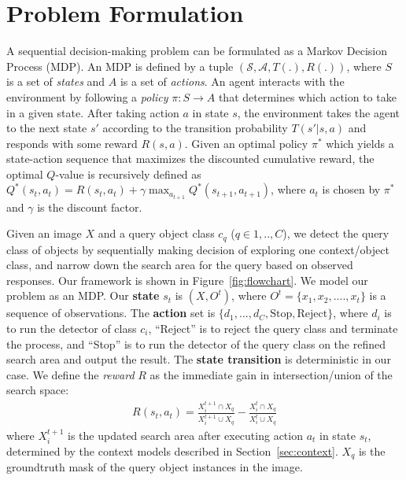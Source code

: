 \section{Problem Formulation}
A sequential decision-making problem can be formulated as a Markov Decision
Process (MDP).
An MDP is defined by a tuple $(\mathcal{S}, \mathcal{A}, T(.), R(.))$,
where $S$ is a set of \textit{states} and $A$ is a set of
\textit{actions}. An agent interacts with the
environment by following a
\textit{policy} $\pi: S \rightarrow A$ that determines which action to take in a
given state. After taking action $a$ in
state $s$, the environment takes the
agent to the next state $s'$ according to the transition probability $T(s'|s,a)$
and responds with some reward $R(s,a)$.
Given an optimal policy $\pi^\ast$ which yields a state-action sequence that maximizes the discounted cumulative reward,
the optimal $Q$-value is recursively defined as $Q^\ast(s_t, a_t) = R(s_t, a_t) + \gamma\max_{a_{t+1}}Q^\ast(s_{t+1}, a_{t+1})$, where $a_t$ is chosen by $\pi^\ast$ and $\gamma$ is the discount factor.

Given an image $X$ and a query object class $c_q$ ($q \in {1,..,C}$),
we detect the query class of objects by sequentially making decision of exploring one context/object class, and narrow down the search area for the query based on observed responses. Our framework is shown in Figure~\ref{fig:flowchart}.
We model our problem as an MDP.
Our \textbf{state} $s_t$ is $(X, O^t)$, where  $O^t= \{x_1, x_2, ....,x_t\}$ is a sequence of observations.
The \textbf{action} set is $\{d_1, ..., d_C, \mbox{Stop}, \mbox{Reject}\}$, where $d_i$ is to run the detector of class $c_i$, ``Reject'' is to reject the query class and terminate the process, and ``Stop'' is to run the detector of the query class on the refined search area and output the result.
The \textbf{state transition} is deterministic in our case.
We define the \textit{reward} $R$ as the immediate gain in intersection/union of the search space:
\begin{eqnarray}
\label{eq:imreward}
R(s_t,a_t) =  \frac{X^{t+1}_i \cap X_q}{X^{t+1}_i \cup X_q} - \frac{X^{t}_i \cap X_q}{X^{t}_i \cup X_q}
\end{eqnarray}
where $X^{t+1}_i$ is the updated search area after executing action $a_t$ in state $s_t$, determined by the context models described in Section~\ref{sec:context}. $X_q$ is the groundtruth mask of the query object instances in the image. 

